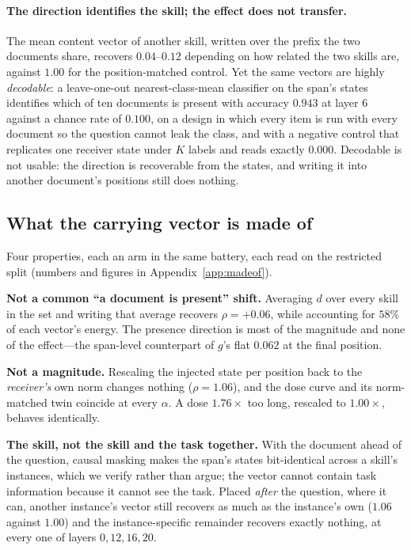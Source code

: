 \documentclass{article}
\newcommand{\dvec}{\ensuremath{d}}
\newcommand{\gvec}{\ensuremath{g}}
\begin{document}
\paragraph{The direction identifies the skill; the effect does not transfer.}
The mean content vector of another skill, written over the prefix the two
documents share, recovers $0.04$--$0.12$ depending on how related the two
skills are, against $1.00$ for the position-matched control. Yet the same
vectors are highly \emph{decodable}: a leave-one-out nearest-class-mean
classifier on the span's states identifies which of ten documents is present
with accuracy $0.943$ at layer 6 against a chance rate of $0.100$, on a design
in which every item is run with every document so the question cannot leak the
class, and with a negative control that replicates one receiver state under $K$
labels and reads exactly $0.000$. Decodable is not usable: the direction is
recoverable from the states, and writing it into another document's positions
still does nothing.

\subsection{What the carrying vector is made of}
\label{sec:whose:docklast}

Four properties, each an arm in the same battery, each read on the restricted
split (numbers and figures in Appendix~\ref{app:madeof}).

\textbf{Not a common ``a document is present'' shift.} Averaging $\dvec$ over
every skill in the set and writing that average recovers $\rho = +0.06$, while
accounting for $58\%$ of each vector's energy. The presence direction is most of
the magnitude and none of the effect---the span-level counterpart of $\gvec$'s
flat $0.062$ at the final position.

\textbf{Not a magnitude.} Rescaling the injected state per position back to the
\emph{receiver's} own norm changes nothing ($\rho = 1.06$), and the dose curve
and its norm-matched twin coincide at every $\alpha$. A dose $1.76\times$ too
long, rescaled to $1.00\times$, behaves identically.

\textbf{The skill, not the skill and the task together.} With the document ahead
of the question, causal masking makes the span's states bit-identical across a
skill's instances, which we verify rather than argue; the vector cannot contain
task information because it cannot see the task. Placed \emph{after} the
question, where it can, another instance's vector still recovers as much as the
instance's own ($1.06$ against $1.00$) and the instance-specific remainder
recovers exactly nothing, at every one of layers $0, 12, 16, 20$.
\end{document}
